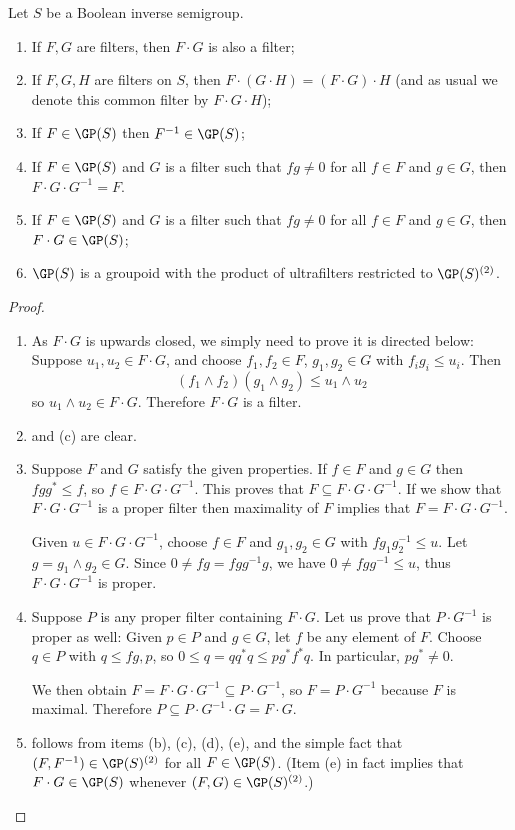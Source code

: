 \begin{proposition}\label{propositionproductofultrafilters}
Let $S$ be a Boolean inverse semigroup.
\begin{enumerate}
\item[(a)] If $F,G$ are filters, then $F\cdot G$ is also a filter;
\item[(b)] If $F,G,H$ are filters on $S$, then $F\cdot (G\cdot H)=(F\cdot G)\cdot H$ (and as usual we denote this common filter by $F\cdot G\cdot H$);
\item[(c)] If $F\in\GP(S)$ then $F^{-1}\in\GP(S)$;
\item[(d)] If $F\in\GP(S)$ and $G$ is a filter such that $fg\neq 0$ for all $f\in F$ and $g\in G$, then $F\cdot G\cdot G^{-1}=F$.
\item[(e)] If $F\in\GP(S)$ and $G$ is a filter such that $fg\neq 0$ for all $f\in F$ and $g\in G$, then $F\cdot G\in\GP(S)$;
\item[(f)] $\GP(S)$ is a groupoid with the product of ultrafilters restricted to $\GP(S)^{(2)}$.
\end{enumerate}
\end{proposition}
\begin{proof}
\begin{enumerate}
\item[(a)] As $F\cdot G$ is upwards closed,  we simply need to prove it is directed below: Suppose $u_1,u_2\in F\cdot G$, and choose $f_1,f_2\in F$, $g_1,g_2\in G$ with $f_ig_i\leq u_i$. Then
\[(f_1\land f_2)(g_1\land g_2)\leq u_1\land u_2\]
so $u_1\land u_2\in F\cdot G$. Therefore $F\cdot G$ is a filter.
\item[(b)] and (c) are clear.
\item[(d)] Suppose $F$ and $G$ satisfy the given properties. If $f\in F$ and $g\in G$ then $fgg^*\leq f$, so $f\in F\cdot G\cdot G^{-1}$. This proves that $F\subseteq F\cdot G\cdot G^{-1}$. If we show that $F\cdot G\cdot G^{-1}$ is a proper filter then maximality of $F$ implies that $F=F\cdot G\cdot G^{-1}$.

Given $u\in F\cdot G\cdot G^{-1}$, choose $f\in F$ and $g_1,g_2\in G$ with $fg_1g_2^{-1}\leq u$. Let $g=g_1\land g_2\in G$. Since $0\neq fg=fgg^{-1}g$, we have $0\neq fgg^{-1}\leq u$, thus $F\cdot G\cdot G^{-1}$ is proper.
\item[(e)] Suppose $P$ is any proper filter containing $F\cdot G$. Let us prove that $P\cdot G^{-1}$ is proper as well: Given $p\in P$ and $g\in G$, let $f$ be any element of $F$. Choose $q\in P$ with $q\leq fg,p$, so $0\leq q=qq^*q\leq pg^*f^*q$. In particular, $pg^*\neq 0$.

We then obtain $F=F\cdot G\cdot G^{-1}\subseteq P\cdot G^{-1}$, so $F=P\cdot G^{-1}$ because $F$ is maximal. Therefore $P\subseteq P\cdot G^{-1}\cdot G=F\cdot G$.
\item[(f)] follows from items (b), (c), (d), (e), and the simple fact that $(F,F^{-1})\in\GP(S)^{(2)}$ for all $F\in\GP(S)$. (Item (e) in fact implies that $F\cdot G\in\GP(S)$ whenever $(F,G)\in\GP(S)^{(2)}$.)\qedhere
\end{enumerate}
\end{proof}

